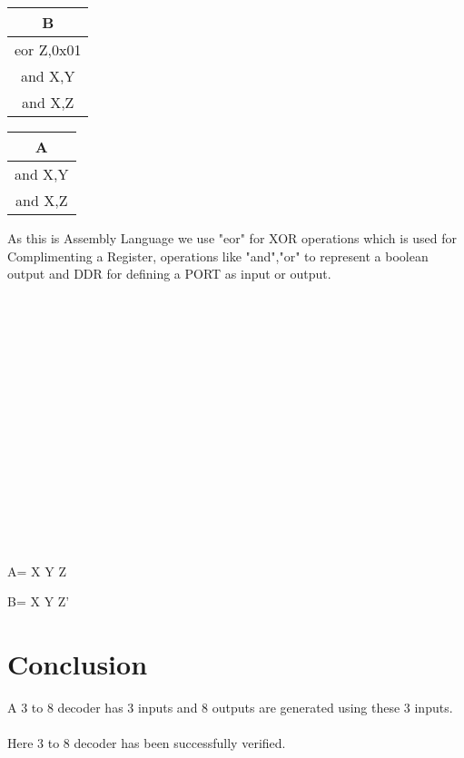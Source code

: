 \documentclass[journal,12pt,twocolumn]{IEEEtran}
\begin{document}
  \begin{center}
     
     \begin{table}[h]
                \centering
                \begin{tabular}{|c|}
                \hline
                B \\
                \hline
                     eor Z,0x01\\
                 
                     
                     and X,Y\\
                     and X,Z\\
                     \hline
                \end{tabular}
            \end{table} 
 \end{center}
  \begin{center}
   
     \begin{table}[h]
                \centering
                \begin{tabular}{|c|}
                \hline
                A \\
                \hline
                     and X,Y\\
                     and X,Z\\
                     \hline
                \end{tabular}
            \end{table}
 \end{center} 

As this is Assembly Language we use "eor" for XOR operations which is used for Complimenting a Register, operations like "and","or" to represent a boolean output and DDR for defining a PORT as input or output.\\
 \\
 \\
 \\
 \\
 \\
 \\
 \\
 \\
 \\
 \\
 \\
 \\
 \\
 \\
 \\
 \begin{center}
  A= X Y Z\\
 \end{center}
 \begin{center}
 
B= X Y Z'\\
 \end{center}
  
 \section{Conclusion}
 A 3 to 8 decoder has 3 inputs and 8 outputs are generated using these 3 inputs.\\
 \\ Here 3 to 8 decoder has been successfully verified.\\
\end{document}
